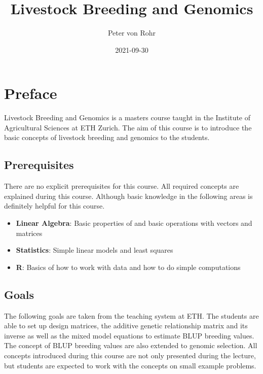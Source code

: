 \documentclass[
]{book}
\title{Livestock Breeding and Genomics}
\author{Peter von Rohr}
\date{2021-09-30}
\providecommand{\tightlist}{%
  \setlength{\itemsep}{0pt}\setlength{\parskip}{0pt}}
\theoremstyle{definition}
\theoremstyle{definition}
\theoremstyle{definition}
\theoremstyle{remark}
\begin{document}
\maketitle

{
\setcounter{tocdepth}{1}
\tableofcontents
}
\hypertarget{preface}{%
\chapter*{Preface}\label{preface}}

Livestock Breeding and Genomics is a masters course taught in the Institute of Agricultural Sciences at ETH Zurich. The aim of this course is to introduce the basic concepts of livestock breeding and genomics to the students.

\hypertarget{prerequisites}{%
\section*{Prerequisites}\label{prerequisites}}

There are no explicit prerequisites for this course. All required concepts are explained during this course. Although basic knowledge in the following areas is definitely helpful for this course.

\begin{itemize}
\tightlist
\item
  \textbf{Linear Algebra}: Basic properties of and basic operations with vectors and matrices
\item
  \textbf{Statistics}: Simple linear models and least squares
\item
  \textbf{R}: Basics of how to work with data and how to do simple computations
\end{itemize}

\hypertarget{goals}{%
\section*{Goals}\label{goals}}

The following goals are taken from the teaching system at ETH. The students are able to set up design matrices, the additive genetic relationship matrix and its inverse as well as the mixed model equations to estimate BLUP breeding values. The concept of BLUP breeding values are also extended to genomic selection. All concepts introduced during this course are not only presented during the lecture, but students are expected to work with the concepts on small example problems.
\end{document}

